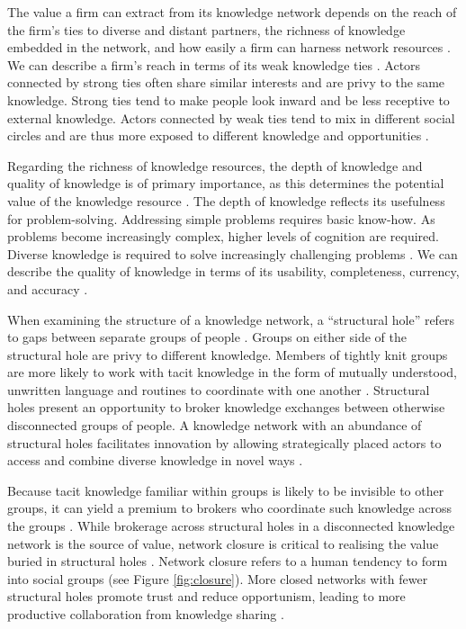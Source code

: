 The value a firm can extract from its knowledge network depends on the reach of the firm's ties to diverse and distant partners, the richness of knowledge embedded in the network, and how easily a firm can harness network resources \citep{gulati2011networks}. We can describe a firm's reach in terms of its weak knowledge ties \citep{hansen1999search}. Actors connected by strong ties often share similar interests and are privy to the same knowledge. Strong ties tend to make people look inward and be less receptive to external knowledge. Actors connected by weak ties tend to mix in different social circles and are thus more exposed to different knowledge and opportunities \citep{granovetter1973strength}. \medskip

Regarding the richness of knowledge resources, the depth of knowledge and quality of knowledge is of primary importance, as this determines the potential value of the knowledge resource \citep{davenport1998working,kane2005knowledge}. The depth of knowledge reflects its usefulness for problem-solving. Addressing simple problems requires basic know-how. As problems become increasingly complex, higher levels of cognition are required. Diverse knowledge is required to solve increasingly challenging problems \citep{webb2002depth,bennet2008depth,jeppesen2010marginality}. We can describe the quality of knowledge in terms of its usability, completeness, currency, and accuracy \citep{wixom2005theoretical}. \medskip

When examining the structure of a knowledge network, a \enquote{structural hole} refers to gaps between separate groups of people \citep{burt2000network}. Groups on either side of the structural hole are privy to different knowledge. Members of tightly knit groups are more likely to work with tacit knowledge in the form of mutually understood, unwritten language and routines to coordinate with one another \citep{burt2007secondhand}. Structural holes present an opportunity to broker knowledge exchanges between otherwise disconnected groups of people. A knowledge network with an abundance of structural holes facilitates innovation by allowing strategically placed actors to access and combine diverse knowledge in novel ways \citep{burt2004structural,sparrowe2011publishing}. \medskip

Because tacit knowledge familiar within groups is likely to be invisible to other groups, it can yield a premium to brokers who coordinate such knowledge across the groups \citep{burt2007secondhand}. While brokerage across structural holes in a disconnected knowledge network is the source of value, network closure is critical to realising the value buried in structural holes \citep{burt2004structural,rost2011strength}. Network closure refers to a human tendency to form into social groups (see Figure \ref{fig:closure}). More closed networks with fewer structural holes promote trust and reduce opportunism, leading to more productive collaboration from knowledge sharing \citep{ahuja2000collaboration, burt2007secondhand}. \medskip

